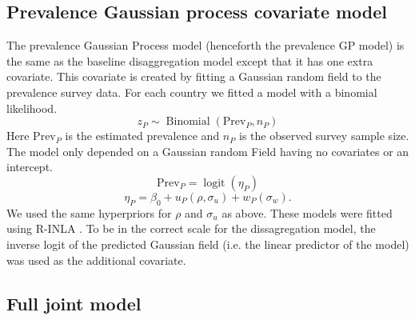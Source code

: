 \documentclass{statsoc}
\begin{document}
%
%
%
%
%
%
%

\subsection*{Prevalence Gaussian process covariate model}

The prevalence Gaussian Process model (henceforth the prevalence GP model) is the same as the baseline disaggregation model except that it has one extra covariate.
This covariate is created by fitting a Gaussian random field to the prevalence survey data.
For each country we fitted a model with a binomial likelihood.
$$z_P \sim \operatorname{Binomial}(\mathrm{Prev}_P, n_P) $$
Here $\mathrm{Prev}_P$ is the estimated prevalence and $n_P$ is the observed survey sample size. 
The model only depended on a Gaussian random Field having no covariates or an intercept.
$$\mathrm{Prev}_P = \operatorname{logit}(\eta_P)$$
$$\eta_P= \beta_0 +  u_P(\rho, \sigma_u) + w_P(\sigma_w).$$
We used the same hyperpriors for $\rho$ and $\sigma_u$ as above. 
These models were fitted using R-INLA \citep{INLA}.
To be in the correct scale for the dissagregation model, the inverse logit of the predicted Gaussian field (i.e. the linear predictor of the model) was used as the additional covariate.

\subsection*{Full joint model}
\end{document}
